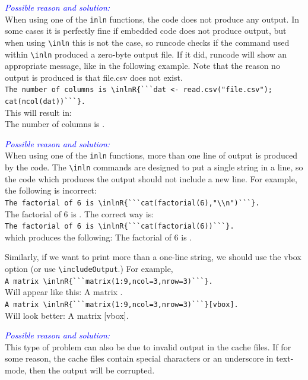 \documentclass[a4paper,10pt]{article}
\newcommand{\cause}[1] {\noindent\textit{\textcolor{blue}{Possible reason and solution:}}\\#1}
\begin{document}
\cause\bgroup
When using one of the \verb|inln| functions, the code does not produce any output.
In some cases it is perfectly fine if embedded code does not produce output, but when using \verb|\inln| this is not the case, so runcode checks if the command used within \verb|\inln| produced a zero-byte output file. If it did, runcode will show an appropriate message, like in the following example. Note that the reason no output is produced is that file.csv does not exist.\\
\verb|The number of columns is \inlnR{```dat <- read.csv("file.csv"); cat(ncol(dat))```}.|\\
This will result in:\\
The number of columns is  .\\
\egroup

\cause\bgroup
When using one of the \verb|inln| functions, more than one line of output is produced by the code.
The \verb|\inln| commands are designed to put a single string in a line, so the code which produces the output should not include a new line. For example, the following is incorrect:\\
\verb|The factorial of 6 is \inlnR{```cat(factorial(6),"\\n")```}.|\\
The factorial of 6 is .
\noindent
The correct way is:\\
\verb|The factorial of 6 is \inlnR{```cat(factorial(6))```}.|\\
which produces the following: 
The factorial of 6 is .


\noindent
Similarly, if we want to print more than a one-line string, we should use the vbox option (or use \verb|\includeOutput|.) For example,\\
\verb|A matrix \inlnR{```matrix(1:9,ncol=3,nrow=3)```}.|\\
Will appear like this: A matrix .
\\
\verb|A matrix \inlnR{```matrix(1:9,ncol=3,nrow=3)```}[vbox].|\\
Will look better: A matrix [vbox].
\egroup


\cause\bgroup
This type of problem can also be due to invalid output in the cache files. If for some reason, the cache files contain special characters or an underscore in text-mode, then the output will be corrupted.
\end{document}
